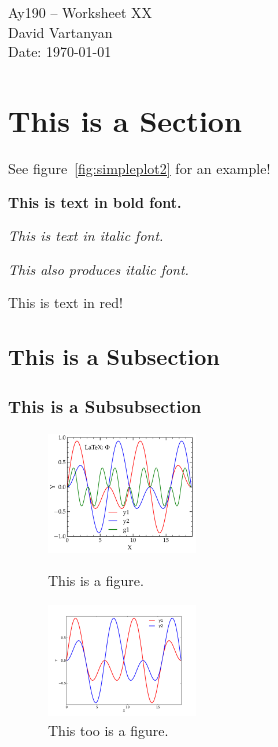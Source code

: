\documentclass[11pt,letterpaper]{article}
\begin{document}
\begin{center}
\Large
Ay190 -- Worksheet XX\\
David Vartanyan\\
Date: \today
\end{center}

\section{This is a Section}

See figure~\ref{fig:simpleplot2} for an example!

{\bf This is text in bold font.}

\emph{This is text in italic font.}

{\it This also produces italic font.}

{\color{red} This is text in red!}

\subsection{This is a Subsection}

\subsubsection{This is a Subsubsection}

\begin{figure}[bth]
\centering
\includegraphics[width=0.35\textwidth]{simpleplot2.pdf}
\caption{This is a figure.}
\label{fig:simpleplot2}
\includegraphics[width=0.35\textwidth]{simpleplot.pdf}
\caption{This too is a figure.}
\label{fig:simpleplot1}
\end{figure}
\end{document}
